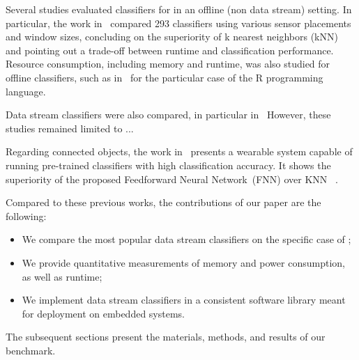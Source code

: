 
Several studies evaluated classifiers for \har in an
offline (non data stream) setting. In particular, the work
in~\cite{Janidarmian_2017} compared 293 classifiers using various sensor
placements and window sizes, concluding on the superiority of k nearest
neighbors (kNN) and pointing out a trade-off between runtime and
classification performance. Resource consumption, including memory and runtime, was also studied 
for offline classifiers, such as in~\cite{memory_consumption_machine_learning}
for the particular case of the R programming language.

Data stream classifiers were also compared, in particular
in~
However, these studies remained limited to ... 

Regarding connected objects, the work in~\cite{omid_2019} presents a
wearable system capable of running pre-trained classifiers  with high classification accuracy. It shows
the superiority of the proposed Feedforward Neural Network~(FNN) over KNN
~. 

Compared to these previous works, the contributions of our paper are the following:
\begin{itemize}
    \item We compare the most popular data stream classifiers on the specific case of \har;
    \item We provide quantitative measurements of memory and power consumption, as well as runtime;
    \item We implement data stream classifiers in a consistent software library meant for deployment on embedded systems.
\end{itemize} 
The subsequent sections present the materials, methods, and results of our benchmark.



